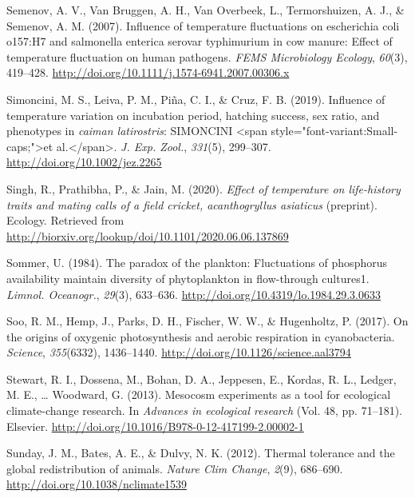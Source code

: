 \documentclass[12pt,twoside]{reedthesis}
\begin{document}
\leavevmode\hypertarget{ref-semenov_influence_2007}{}%
Semenov, A. V., Van Bruggen, A. H., Van Overbeek, L., Termorshuizen, A. J., \& Semenov, A. M. (2007). Influence of temperature fluctuations on escherichia coli o157:H7 and salmonella enterica serovar typhimurium in cow manure: Effect of temperature fluctuation on human pathogens. \emph{FEMS Microbiology Ecology}, \emph{60}(3), 419--428. \url{http://doi.org/10.1111/j.1574-6941.2007.00306.x}

\leavevmode\hypertarget{ref-simoncini_influence_2019}{}%
Simoncini, M. S., Leiva, P. M., Piña, C. I., \& Cruz, F. B. (2019). Influence of temperature variation on incubation period, hatching success, sex ratio, and phenotypes in \emph{caiman latirostris}: SIMONCINI \textless{}span style="font-variant:Small-caps;"\textgreater{}et al.\textless{}/span\textgreater{}. \emph{J. Exp. Zool.}, \emph{331}(5), 299--307. \url{http://doi.org/10.1002/jez.2265}

\leavevmode\hypertarget{ref-singh_effect_2020}{}%
Singh, R., Prathibha, P., \& Jain, M. (2020). \emph{Effect of temperature on life-history traits and mating calls of a field cricket, \textup{acanthogryllus asiaticus}} (preprint). Ecology. Retrieved from \url{http://biorxiv.org/lookup/doi/10.1101/2020.06.06.137869}

\leavevmode\hypertarget{ref-sommer_paradox_1984}{}%
Sommer, U. (1984). The paradox of the plankton: Fluctuations of phosphorus availability maintain diversity of phytoplankton in flow-through cultures1. \emph{Limnol. Oceanogr.}, \emph{29}(3), 633--636. \url{http://doi.org/10.4319/lo.1984.29.3.0633}

\leavevmode\hypertarget{ref-soo_origins_2017}{}%
Soo, R. M., Hemp, J., Parks, D. H., Fischer, W. W., \& Hugenholtz, P. (2017). On the origins of oxygenic photosynthesis and aerobic respiration in cyanobacteria. \emph{Science}, \emph{355}(6332), 1436--1440. \url{http://doi.org/10.1126/science.aal3794}

\leavevmode\hypertarget{ref-stewart_mesocosm_2013}{}%
Stewart, R. I., Dossena, M., Bohan, D. A., Jeppesen, E., Kordas, R. L., Ledger, M. E., \ldots{} Woodward, G. (2013). Mesocosm experiments as a tool for ecological climate-change research. In \emph{Advances in ecological research} (Vol. 48, pp. 71--181). Elsevier. \url{http://doi.org/10.1016/B978-0-12-417199-2.00002-1}

\leavevmode\hypertarget{ref-sunday_thermal_2012}{}%
Sunday, J. M., Bates, A. E., \& Dulvy, N. K. (2012). Thermal tolerance and the global redistribution of animals. \emph{Nature Clim Change}, \emph{2}(9), 686--690. \url{http://doi.org/10.1038/nclimate1539}
\end{document}
